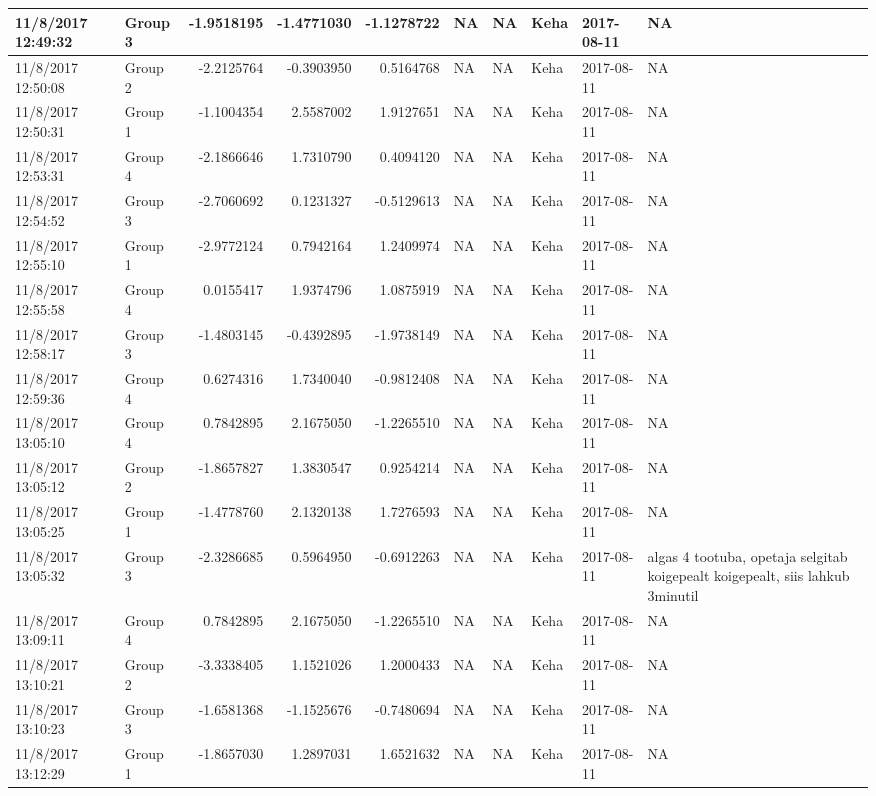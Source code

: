 \documentclass[]{article}
\begin{document}
\begin{tabular}{l|l|r|r|r|l|l|l|l|l}
\hline
11/8/2017 12:49:32 & Group 3 & -1.9518195 & -1.4771030 & -1.1278722 & NA & NA & Keha & 2017-08-11 & NA\\
\hline
11/8/2017 12:50:08 & Group 2 & -2.2125764 & -0.3903950 & 0.5164768 & NA & NA & Keha & 2017-08-11 & NA\\
\hline
11/8/2017 12:50:31 & Group 1 & -1.1004354 & 2.5587002 & 1.9127651 & NA & NA & Keha & 2017-08-11 & NA\\
\hline
11/8/2017 12:53:31 & Group 4 & -2.1866646 & 1.7310790 & 0.4094120 & NA & NA & Keha & 2017-08-11 & NA\\
\hline
11/8/2017 12:54:52 & Group 3 & -2.7060692 & 0.1231327 & -0.5129613 & NA & NA & Keha & 2017-08-11 & NA\\
\hline
11/8/2017 12:55:10 & Group 1 & -2.9772124 & 0.7942164 & 1.2409974 & NA & NA & Keha & 2017-08-11 & NA\\
\hline
11/8/2017 12:55:58 & Group 4 & 0.0155417 & 1.9374796 & 1.0875919 & NA & NA & Keha & 2017-08-11 & NA\\
\hline
11/8/2017 12:58:17 & Group 3 & -1.4803145 & -0.4392895 & -1.9738149 & NA & NA & Keha & 2017-08-11 & NA\\
\hline
11/8/2017 12:59:36 & Group 4 & 0.6274316 & 1.7340040 & -0.9812408 & NA & NA & Keha & 2017-08-11 & NA\\
\hline
11/8/2017 13:05:10 & Group 4 & 0.7842895 & 2.1675050 & -1.2265510 & NA & NA & Keha & 2017-08-11 & NA\\
\hline
11/8/2017 13:05:12 & Group 2 & -1.8657827 & 1.3830547 & 0.9254214 & NA & NA & Keha & 2017-08-11 & NA\\
\hline
11/8/2017 13:05:25 & Group 1 & -1.4778760 & 2.1320138 & 1.7276593 & NA & NA & Keha & 2017-08-11 & NA\\
\hline
11/8/2017 13:05:32 & Group 3 & -2.3286685 & 0.5964950 & -0.6912263 & NA & NA & Keha & 2017-08-11 & algas 4 tootuba, opetaja selgitab koigepealt koigepealt, siis lahkub 3minutil\\
\hline
11/8/2017 13:09:11 & Group 4 & 0.7842895 & 2.1675050 & -1.2265510 & NA & NA & Keha & 2017-08-11 & NA\\
\hline
11/8/2017 13:10:21 & Group 2 & -3.3338405 & 1.1521026 & 1.2000433 & NA & NA & Keha & 2017-08-11 & NA\\
\hline
11/8/2017 13:10:23 & Group 3 & -1.6581368 & -1.1525676 & -0.7480694 & NA & NA & Keha & 2017-08-11 & NA\\
\hline
11/8/2017 13:12:29 & Group 1 & -1.8657030 & 1.2897031 & 1.6521632 & NA & NA & Keha & 2017-08-11 & NA\\

\end{tabular}
\end{document}
